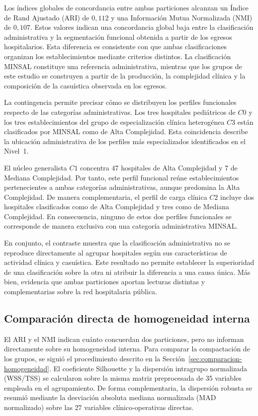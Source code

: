 Los índices globales de concordancia entre ambas particiones alcanzan un
Índice de Rand Ajustado (ARI) de $0{,}112$ y una Información Mutua
Normalizada (NMI) de $0{,}107$. Estos valores indican una concordancia global
baja entre la clasificación administrativa y la segmentación funcional
obtenida a partir de los egresos hospitalarios. Esta diferencia es consistente
con que ambas clasificaciones organizan los establecimientos mediante criterios
distintos. La clasificación MINSAL constituye una referencia administrativa,
mientras que los grupos de este estudio se construyen a partir de la
producción, la complejidad clínica y la composición de la casuística observada
en los egresos.

La contingencia permite precisar cómo se distribuyen los perfiles funcionales
respecto de las categorías administrativas. Los tres hospitales pediátricos de
$C0$ y los tres establecimientos del grupo de especialización clínica
heterogénea $C3$ están clasificados por MINSAL como de Alta Complejidad. Esta
coincidencia describe la ubicación administrativa de los perfiles más
especializados identificados en el Nivel~1.

El núcleo generalista $C1$ concentra 47 hospitales de Alta Complejidad y 7 de
Mediana Complejidad. Por tanto, este perfil funcional reúne establecimientos
pertenecientes a ambas categorías administrativas, aunque predomina la Alta
Complejidad. De manera complementaria, el perfil de carga clínica $C2$ incluye
dos hospitales clasificados como de Alta Complejidad y tres como de Mediana
Complejidad. En consecuencia, ninguno de estos dos perfiles funcionales se
corresponde de manera exclusiva con una categoría administrativa MINSAL.

En conjunto, el contraste muestra que la clasificación administrativa no se
reproduce directamente al agrupar hospitales según sus características de
actividad clínica y casuística. Este resultado no permite establecer la
superioridad de una clasificación sobre la otra ni atribuir la diferencia a una
causa única. Más bien, evidencia que ambas particiones aportan lecturas
distintas y complementarias sobre la red hospitalaria pública.

\subsection{Comparación directa de homogeneidad interna}
\label{sec:res-homogeneidad}

El ARI y el NMI indican cuánto concuerdan dos particiones, pero no informan
directamente sobre su homogeneidad interna. Para comparar la compactación de los
grupos, se siguió el procedimiento descrito en la
Sección~\ref{sec:comparacion-homogeneidad}. El coeficiente Silhouette y la
dispersión intragrupo normalizada (WSS/TSS) se calcularon sobre la misma matriz
preprocesada de 35 variables empleada en el agrupamiento. De forma
complementaria, la dispersión robusta se resumió mediante la desviación absoluta
mediana normalizada (MAD normalizado) sobre las 27 variables
clínico-operativas directas.

